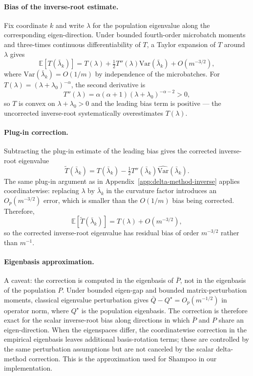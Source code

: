 \documentclass{article}
\newcommand{\E}{\mathbb{E}}
\newcommand{\Var}{\mathrm{Var}}
\begin{document}
\paragraph{Bias of the inverse-root estimate.}
Fix coordinate $k$ and write $\lambda$ for the population eigenvalue along the corresponding eigen-direction. Under bounded fourth-order microbatch moments and three-times continuous differentiability of $T$, a Taylor expansion of $T$ around $\lambda$ gives
\begin{equation}
    \E[T(\bar\lambda_k)]
    =
    T(\lambda)
    +
    \tfrac{1}{2}T''(\lambda)\Var(\bar\lambda_k)
    +
    O(m^{-3/2}),
\end{equation}
where $\Var(\bar\lambda_k)=O(1/m)$ by independence of the microbatches. For $T(\lambda)=(\lambda+\lambda_0)^{-\alpha}$, the second derivative is
\begin{equation}
    T''(\lambda)
    =
    \alpha(\alpha+1)(\lambda+\lambda_0)^{-\alpha-2}
    >0,
\end{equation}
so $T$ is convex on $\lambda+\lambda_0>0$ and the leading bias term is positive --- the uncorrected inverse-root systematically overestimates $T(\lambda)$.

\paragraph{Plug-in correction.}
Subtracting the plug-in estimate of the leading bias gives the corrected inverse-root eigenvalue
\begin{equation}
    \widetilde T(\bar\lambda_k)
    =
    T(\bar\lambda_k)
    -
    \tfrac{1}{2}T''(\bar\lambda_k)\widehat{\Var}(\bar\lambda_k).
    \label{eq:invroot-correction}
\end{equation}
The same plug-in argument as in Appendix~\ref{app:delta-method-inverse} applies coordinatewise: replacing $\lambda$ by $\bar\lambda_k$ in the curvature factor introduces an $O_p(m^{-3/2})$ error, which is smaller than the $O(1/m)$ bias being corrected. Therefore,
\begin{equation}
    \E[\widetilde T(\bar\lambda_k)]
    =
    T(\lambda)
    +
    O(m^{-3/2}),
\end{equation}
so the corrected inverse-root eigenvalue has residual bias of order $m^{-3/2}$ rather than $m^{-1}$.

\paragraph{Eigenbasis approximation.}
A caveat: the correction is computed in the eigenbasis of $\bar P$, not in the eigenbasis of the population $P$. Under bounded eigen-gap and bounded matrix-perturbation moments, classical eigenvalue perturbation gives $\bar Q-Q^\star=O_p(m^{-1/2})$ in operator norm, where $Q^\star$ is the population eigenbasis. The correction is therefore exact for the scalar inverse-root bias along directions in which $\bar P$ and $P$ share an eigen-direction. When the eigenspaces differ, the coordinatewise correction in the empirical eigenbasis leaves additional basis-rotation terms; these are controlled by the same perturbation assumptions but are not canceled by the scalar delta-method correction. This is the approximation used for Shampoo in our implementation.
\end{document}
